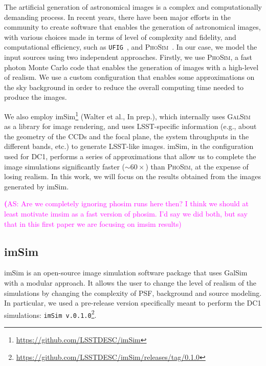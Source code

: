 \documentclass[twocolumn]{aastex62}
\newcommand{\as}[1]{{\textcolor{magenta}{{\textbf (AS: #1)}}}}
\begin{document}
The artificial generation of astronomical images is a complex and computationally demanding process. In recent
years, there have been major efforts in the community to create software that enables the generation of astronomical images, with various choices made in terms of level of complexity and fidelity, and computational efficiency, such as \texttt{UFIG}~\citep{2016ApJ...817...25B}, and \textsc{PhoSim}~\citep{2015ApJS..218...14P}. In our case, we model the input sources using
two independent approaches. Firstly, we use \textsc{PhoSim}, a fast photon Monte Carlo code that enables the generation of images with a high-level of realism. We use a custom configuration that enables some
approximations on the sky background in order to reduce the overall computing time needed to produce the images.

We also employ imSim\footnote{\url{https://github.com/LSSTDESC/imSim}} (Walter et al., In prep.), which internally uses \textsc{GalSim}~\citep{2015A&C....10..121R} as a library for image rendering, and uses LSST-specific information (e.g., about the geometry of the CCDs and the focal plane, the system throughputs in the different bands, etc.) to generate LSST-like images. imSim, in the configuration used for DC1, performs a series of approximations that allow us to complete the image simulations significantly faster ($\sim 60\times$) than \textsc{PhoSim}, at the expense of losing realism. In this work, we will focus on the results obtained from the images generated by imSim.

\as{Are we completely ignoring phosim runs here then? I think we should at least motivate imsim as a fast version of phosim. I'd say we did both, but say that in this first paper we are focusing on imsim results}


\subsection{imSim}
\label{sec:imsim_pipeline}

imSim is an open-source image simulation software package that uses GalSim with a modular approach. It allows the user to change the level of realism of the simulations by changing the complexity of PSF, background and source modeling. In particular, we used a pre-release version specifically meant to perform the DC1 simulations: \texttt{imSim v.0.1.0}\footnote{\url{https://github.com/LSSTDESC/imSim/releases/tag/0.1.0}}.
\end{document}
